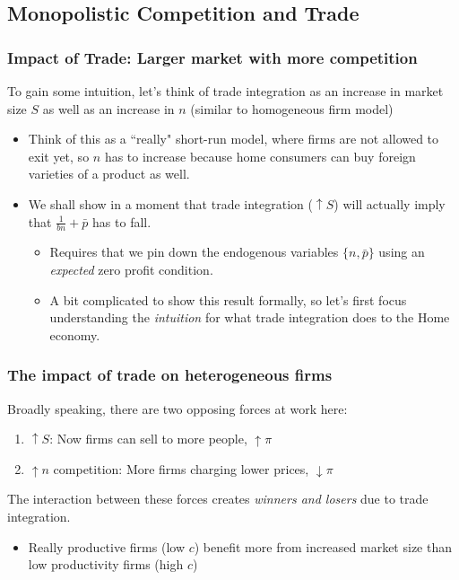 \documentclass{beamer}
\begin{document}
\subsection{Monopolistic Competition and Trade}
\begin{frame}
	\frametitle{Impact of Trade: Larger market with more competition}
To gain some intuition,  let's think of trade integration as an increase in market size $S$ as well as an increase in $n$ (similar to homogeneous firm model)
	\begin{itemize}
				\item Think of this as a ``really" short-run model, where firms are not allowed to exit yet, so $n$ has to increase because home consumers can buy foreign varieties of a product as well. 
				\item We shall show in a moment that trade integration ($\uparrow S$) will actually imply that $\frac{1}{bn}+\bar{p}$ has to fall.
					\begin{itemize}
						\item Requires that we pin down the endogenous variables $\{n,\bar{p}\}$ using an \emph{expected} zero profit condition.
						\item A bit complicated to show this result formally, so let's first focus understanding the \emph{intuition} for what trade integration does to the Home economy.  
					\end{itemize}
	\end{itemize}


\end{frame}

\begin{frame}
	\frametitle{The impact of trade on heterogeneous firms}
 Broadly speaking, there are two opposing forces at work here:
		\begin{enumerate}
			\item $\uparrow S$: Now firms can sell to more people, $\uparrow \pi$
			\item $\uparrow n $ competition: More firms charging lower prices,  $\downarrow \pi$
		\end{enumerate}
The interaction between these forces creates \emph{winners and losers} due to trade integration. 
	\begin{itemize}
		\item Really productive firms (low $c$) benefit more from increased market size than low productivity firms (high $c$)
	\end{itemize}

\end{frame}
\end{document}
